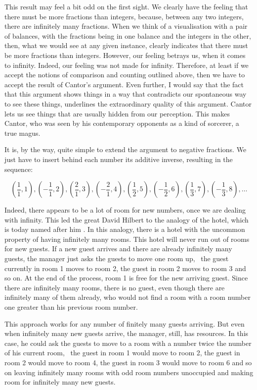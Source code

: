 \documentclass[tikz]{scrreprt}
\begin{document}
This result may feel a bit odd on the first sight.
We clearly have the feeling that there must
be more fractions than integers, because,
between any two integers, there are infinitely many
fractions. 
When we think of a visualisation with a pair of balances,
with the fractions being in one balance and the integers
in the other, then, what we would see at any given instance, 
clearly indicates that there must be more fractions than integers.
However, our feeling betrays us, when it comes
to infinity. Indeed, our feeling was not made for infinity.
Therefore, at least if we accept the notions
of comparison and counting outlined above,
then we have to accept the result of Cantor's
argument.
Even further, I would say that the fact that this argument
shows things in a way that contradicts our spontaneous
way to see these things, underlines
the extraordinary quality of this argument.
Cantor lets us see things that are usually
hidden from our perception.
This makes Cantor, who was seen by his
contemporary opponents as a kind of sorcerer,
a true magus.

It is, by the way, quite simple
to extend the argument to negative fractions.
We just have to insert behind each number
its additive inverse, resulting in
the sequence:

\[
 \left(\frac{1}{1},1\right),
 \left(-\frac{1}{1},2\right),
 \left(\frac{2}{1},3\right), 
 \left(-\frac{2}{1},4\right), 
 \left(\frac{1}{2},5\right), 
 \left(-\frac{1}{2},6\right), 
 \left(\frac{1}{3},7\right), 
 \left(-\frac{1}{3},8\right), 
 \dots
\]

Indeed, there appears to be a lot of room
for new numbers, once we are dealing with
infinity.
This led the great David Hilbert to the
analogy of the hotel, which is today 
named after him .
In this analogy, there is a hotel with the
uncommon property of having infinitely
many rooms. This hotel will never run
out of rooms for new guests.
If a new guest arrives and there are
already infinitely many guests,
the manager just asks the guests
to move one room up, \ie\ the guest
currently in room 1 moves to room 2,
the guest in room 2 moves to room 3
and so on. 
At the end of the process,
room 1 is free for the new arriving guest.
Since there are infinitely
many rooms, there is no guest,
even though there are infinitely many of them already,
who would not find a room with a room number
one greater than his previous room number.

This approach works for any number of finitely many
guests arriving.
But even when infinitely many new guests arrive,
the manager, still, has resources.
In this case, he could ask the guests to move to
a room with a number twice the number of his
current room, \eg\ the guest in room 1
would move to room 2, the guest in room 2
would move to room 4, the guest in room 3
would move to room 6 and so on
leaving infinitely many rooms
with odd room numbers unoccupied
and making room for infinitely many new guests.
\end{document}
